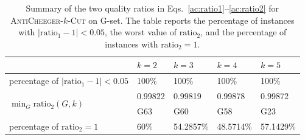 \documentclass[12pt, a4paper]{article}%
\numberwithin{equation}{section}
\theoremstyle{plain}
\begin{document}
				
				
				\begin{table}[htbp]
					\centering
                    \caption{{Summary of the two quality ratios in
Eqs.~\eqref{ac:ratio1}--\eqref{ac:ratio2} for
\textsc{AntiCheeger}-$k$-\textsc{Cut} on G-set. The table reports the
percentage of instances with $|\text{ratio}_1-1|<0.05$, the worst value of
$\text{ratio}_2$, and the percentage of instances with $\text{ratio}_2=1$.}}
					\label{tab:ac-quality}
					\begin{tabular}{|l|l|l|l|l|}
						\hline
						& $k=2$     & $k=3$     & $k=4$     & $k=5$     \\ \hline
						percentage of $|\text{ratio}_1-1|< 0.05$          & 100\%     & 100\% & 100\%     & 100\% \\ \hline
						\multirow{2}{*}{$\min_{G}\text{ratio}_2(G,k)$} & 0.99822   & 0.99819  & 0.99878   & 0.99872   \\
						& G63       & G60       & G58       & G23       \\ \hline
						percentage of $\text{ratio}_2=1$                 & 60\% & 54.2857\% & 48.5714\% & 57.1429\% \\ \hline
					\end{tabular}
				\end{table}
				
\end{document}
